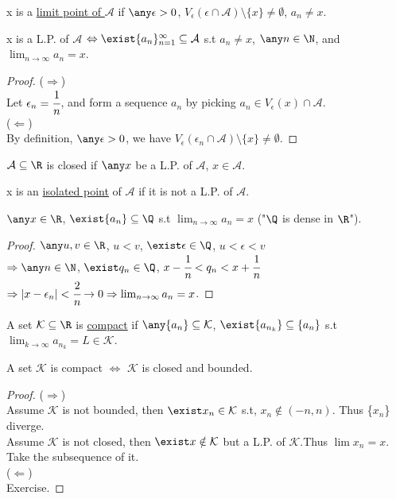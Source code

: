 \begin{definition}
    x is a \uline{limit point of $\mathcal{A}$} if $\any \epsilon > 0$, $V_\epsilon(\epsilon \cap \mathcal{A}) \setminus \{x\} \neq \emptyset$, $a_n \neq x$.
\end{definition}
\begin{theorem}
    x is a L.P. of $\mathcal{A}$ $\Leftrightarrow \exist \{ a_n \}_{n=1}^\infty \subseteq \mathcal{A}$ s.t $a_n \neq x$, $\any n \in \N$, and $\lim_{n\to\infty} a_n = x$.
\end{theorem}
\begin{proof}
    ($\Rightarrow$) \\
    Let $\epsilon_n = \cfrac{1}{n}$, and form a sequence {$a_n$} by picking $a_n \in V_{\epsilon}(x)\cap\mathcal{A}$. \\
    ($\Leftarrow$) \\
    By definition, $\any \epsilon > 0$, we have $V_\epsilon(\epsilon_n \cap \mathcal{A}) \setminus \{x\} \neq \emptyset$.
\end{proof}
\begin{definition}
    $\mathcal{A} \subseteq \R$ is closed if $\any x$ be a L.P. of $\mathcal{A}$, $x \in \mathcal{A}$.
\end{definition}
\begin{definition}
    x is an \uline{isolated point} of $\mathcal{A}$ if it is not a L.P. of $\mathcal{A}$.
\end{definition}
\begin{theorem}
    $\any x \in \R$, $\exist \{a_n\} \subseteq \Q$ s.t $\lim_{n\to\infty} a_n = x$ ("$\Q$ is dense in $\R$").
\end{theorem}
\begin{proof}
    $\any u,v \in \R$, $u<v$, $\exist\epsilon \in \Q$, $u<\epsilon<v$ \\
    $\Rightarrow \any n\in \N$, $\exist q_n \in \Q$, $x-\cfrac{1}{n} < q_n <x+ \cfrac{1}{n}$\\
    $\Rightarrow |x-\epsilon_n| < \cfrac{2}{n} \rightarrow 0 \Rightarrow \lim_{n\to\infty} a_n =x$.
\end{proof}
\begin{definition}
    A set $\mathcal{K} \subseteq \R$ is \uline{compact} if $\any \{a_n\} \subseteq \mathcal{K}$, $\exist \{ a_{n_k} \} \subseteq\{a_n\}$ s.t $\lim_{k\to\infty} a_{n_k} = L \in \mathcal{K}$.
\end{definition}
\begin{theorem}
    A set $\mathcal{K}$ is compact $\Leftrightarrow$ $\mathcal{K}$ is closed and bounded.
\end{theorem}
\begin{proof}
    ($\Rightarrow$)\\
    Assume $\mathcal{K}$ is not bounded, then $\exist x_n \in \mathcal{K}$ s.t, $x_n \notin (-n,n)$. Thus \{$x_n$\} diverge. \\
    Assume $\mathcal{K}$ is not closed, then $\exist x \notin \mathcal{K}$ but a L.P. of $\mathcal{K}$.Thus $\lim x_n = x$. Take the subsequence of it. \\
    ($\Leftarrow$) \\
    Exercise.
\end{proof}

